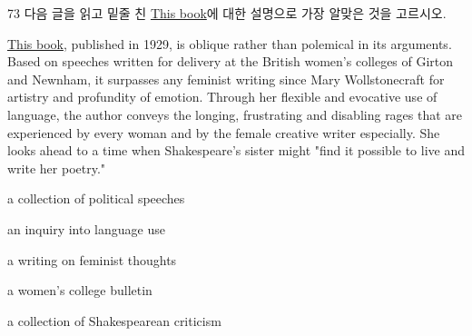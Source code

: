 \begin{question}{73}
다음 글을 읽고 밑줄 친 \uline{This book}에 대한 설명으로 가장 알맞은 것을 고르시오.
\begin{framedtext}
\uline{This book}, published in 1929, is oblique rather than polemical in its arguments. Based on speeches written for delivery at the British women's colleges of Girton and Newnham, it surpasses any feminist writing since Mary Wollstonecraft for artistry and profundity of emotion. Through her flexible and evocative use of language, the author conveys the longing, frustrating and disabling rages that are experienced by every woman and by the female creative writer especially. She looks ahead to a time when Shakespeare's sister might "find it possible to live and write her poetry."
\end{framedtext}
\begin{choices}
  \item a collection of political speeches
  \item an inquiry into language use
  \item a writing on feminist thoughts
  \item a women's college bulletin
  \item a collection of Shakespearean criticism
\end{choices}
\end{question}
